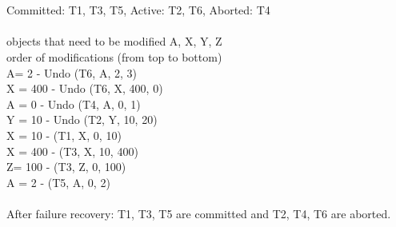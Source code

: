 \documentclass[11pt, oneside]{article}   	%
\begin{document}
\begin{enumerate}
\\ 
\\Committed: T1, T3, T5, Active: T2, T6, Aborted: T4
\\
\\ objects that need to be modified A, X, Y, Z
\\ order of modifications (from top to bottom)
\\ A= 2 - Undo (T6, A, 2, 3)
\\ X = 400 - Undo (T6, X, 400, 0)
\\ A = 0 - Undo (T4, A, 0, 1)
\\ Y = 10 - Undo (T2, Y, 10, 20)
\\ X = 10 - (T1, X, 0, 10)
\\ X = 400 - (T3, X, 10, 400)
\\ Z= 100 - (T3, Z, 0, 100)
\\ A = 2 - (T5, A, 0, 2) 
\\
\\ After failure recovery: T1, T3, T5 are committed and T2, T4, T6 are aborted.
\end{enumerate}
\end{document}
